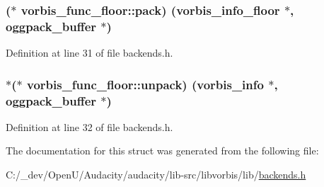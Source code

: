 \subsubsection[{\texorpdfstring{pack}{pack}}]{($\ast$ vorbis\+\_\+func\+\_\+floor\+::pack) ({\bf vorbis\+\_\+info\+\_\+floor} $\ast$, {\bf oggpack\+\_\+buffer} $\ast$)}\hypertarget{structvorbis__func__floor_a5ed136bf40cd5e778b3292406a455c03}{}\label{structvorbis__func__floor_a5ed136bf40cd5e778b3292406a455c03}


Definition at line 31 of file backends.\+h.

\subsubsection[{\texorpdfstring{unpack}{unpack}}]{$\ast$($\ast$ vorbis\+\_\+func\+\_\+floor\+::unpack) ({\bf vorbis\+\_\+info} $\ast$, {\bf oggpack\+\_\+buffer} $\ast$)}\hypertarget{structvorbis__func__floor_aecae65a77c093aa23b68da46b046d4b1}{}\label{structvorbis__func__floor_aecae65a77c093aa23b68da46b046d4b1}


Definition at line 32 of file backends.\+h.



The documentation for this struct was generated from the following file\+:\begin{DoxyCompactItemize}
\item 
C\+:/\+\_\+dev/\+Open\+U/\+Audacity/audacity/lib-\/src/libvorbis/lib/\hyperlink{backends_8h}{backends.\+h}\end{DoxyCompactItemize}
